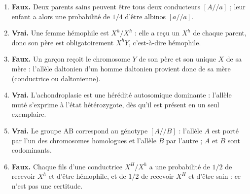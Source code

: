 \documentclass[11pt]{article}
\newcommand{\cle}[1]{{\popxbold\color{popdark}#1}}
\begin{document}
\begin{corrige}
\begin{enumerate}
\item \textbf{Faux.} Deux parents sains peuvent être tous deux conducteurs $[A//a]$ ; leur enfant a alors une probabilité de $1/4$ d'être albinos $[a//a]$.
\item \textbf{Vrai.} Une femme hémophile est $X^{h}/X^{h}$ : elle a reçu un $X^{h}$ de chaque parent, donc son père est obligatoirement $X^{h}Y$, c'est-à-dire hémophile.
\item \textbf{Faux.} Un garçon reçoit le chromosome $Y$ de son père et son unique $X$ de sa mère : l'allèle daltonien d'un homme daltonien provient donc de sa \cle{mère} (conductrice ou daltonienne).
\item \textbf{Vrai.} L'achondroplasie est une hérédité autosomique \cle{dominante} : l'allèle muté s'exprime à l'état hétérozygote, dès qu'il est présent en un seul exemplaire.
\item \textbf{Vrai.} Le groupe AB correspond au génotype $[A//B]$ : l'allèle $A$ est porté par l'un des chromosomes homologues et l'allèle $B$ par l'autre ; $A$ et $B$ sont codominants.
\item \textbf{Faux.} Chaque fils d'une conductrice $X^{H}/X^{h}$ a une probabilité de $1/2$ de recevoir $X^{h}$ et d'être hémophile, et de $1/2$ de recevoir $X^{H}$ et d'être sain : ce n'est pas une certitude.
\end{enumerate}
\end{corrige}
\end{document}
